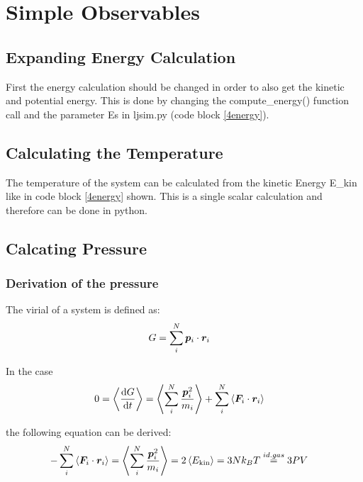 \section{Simple Observables}

\subsection{Expanding Energy Calculation}

First the energy calculation should be changed in order to also get the kinetic and potential energy.
This is done by changing the compute\_energy() function call and the parameter Es in ljsim.py (code block \ref{4energy}).


\subsection{Calculating the Temperature}

The temperature of the system can be calculated from the kinetic Energy E\_kin like in code block \ref{4energy} shown. This is a single scalar calculation and therefore can be done in python.

\subsection{Calcating Pressure}

\subsubsection*{Derivation of the pressure}

The virial of a system is defined as:
\begin{align}
G
	&=\sum_i^N\boldsymbol{p}_i\cdot\boldsymbol{r}_i
	\label{4p1}
\end{align}

In the case
\begin{align}
0
	&=\left\langle\frac{\text{d} G}{\text{d} t}\right\rangle 
	=\left\langle\sum_i^N\frac{\boldsymbol{p}_i^2}{m_i}\right\rangle+\sum_i^N\left\langle\boldsymbol{F}_i\cdot\boldsymbol{r}_i\right\rangle
	\label{4p2}
\end{align}

the following equation can be derived:
\begin{align}
-\sum_i^N\left\langle\boldsymbol{F}_i\cdot\boldsymbol{r}_i\right\rangle
	&=\left\langle\sum_i^N\frac{\boldsymbol{p}_i^2}{m_i}\right\rangle
	=2\left\langle E_\text{kin}\right\rangle
	=3Nk_BT
	\stackrel{id.gas}{=}3PV
	\label{4p3}
\end{align}

